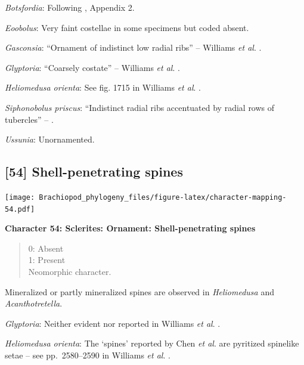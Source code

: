 \documentclass[openany]{book}
\theoremstyle{definition}
\theoremstyle{definition}
\theoremstyle{definition}
\theoremstyle{remark}
\begin{document}
\hypertarget{Botsfordia-coding-53}{}
\emph{Botsfordia}: Following \citet{Williams1998Thediversity}, Appendix
2.

\hypertarget{Eoobolus-coding-53}{}
\emph{Eoobolus}: Very faint costellae in some specimens but coded
absent.

\hypertarget{Gasconsia-coding-53}{}
\emph{Gasconsia}: ``Ornament of indistinct low radial ribs'' -- Williams
\emph{et al}. \citeyearpar[p167]{Williams2000LinguliformeaCraniiformea}.

\hypertarget{Glyptoria-coding-53}{}
\emph{Glyptoria}: ``Coarsely costate'' -- Williams \emph{et al}.
\citeyearpar[p710]{Williams2000LinguliformeaCraniiformea}.

\hypertarget{Heliomedusa_orienta-coding-53}{}
\emph{Heliomedusa orienta}: See fig. 1715 in Williams \emph{et al}.
\citeyearpar{Williams2007Supplement}.

\hypertarget{Siphonobolus_priscus-coding-53}{}
\emph{Siphonobolus priscus}: ``Indistinct radial ribs accentuated by
radial rows of tubercles'' -- \citet{Popov2009Earlyontogeny}.

\hypertarget{Ussunia-coding-53}{}
\emph{Ussunia}: Unornamented.

\subsection*{{[}54{]} Shell-penetrating
spines}\label{shell-penetrating-spines}

\texttt{[image: Brachiopod\_phylogeny\_files/figure-latex/character-mapping-54.pdf]}

\textbf{Character 54: Sclerites: Ornament: Shell-penetrating spines}

\begin{quote}
0: Absent\\
1: Present\\
Neomorphic character.
\end{quote}

Mineralized or partly mineralized spines are observed in
\emph{Heliomedusa} and \emph{Acanthotretella}.

\hypertarget{Glyptoria-coding-54}{}
\emph{Glyptoria}: Neither evident nor reported in Williams \emph{et al}.
\citeyearpar{Williams2000LinguliformeaCraniiformea}.

\hypertarget{Heliomedusa_orienta-coding-54}{}
\emph{Heliomedusa orienta}: The `spines' reported by Chen \emph{et al}.
\citeyearpar{Chen2007Reinterpretationof} are pyritized spinelike\\
setae -- see pp.~2580--2590 in Williams \emph{et al}.
\citeyearpar{Williams2007Supplement}.
\end{document}
